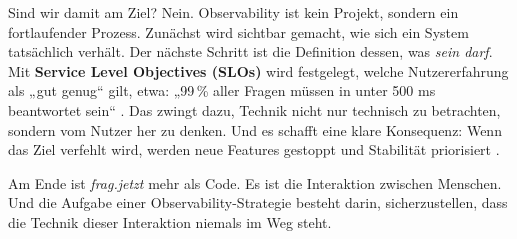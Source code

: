 Sind wir damit am Ziel? Nein. Observability ist kein Projekt, sondern ein fortlaufender Prozess. Zunächst wird sichtbar gemacht, wie sich ein System tatsächlich verhält. Der nächste Schritt ist die Definition dessen, was \emph{sein darf}. Mit \textbf{Service Level Objectives (SLOs)} wird festgelegt, welche Nutzererfahrung als „gut genug“ gilt, etwa: „99\,\% aller Fragen müssen in unter 500 ms beantwortet sein“ \cite{ewaschukMonitoringDistributedSystems}. Das zwingt dazu, Technik nicht nur technisch zu betrachten, sondern vom Nutzer her zu denken. Und es schafft eine klare Konsequenz: Wenn das Ziel verfehlt wird, werden neue Features gestoppt und Stabilität priorisiert \cite{abieba2025advanced}.

Am Ende ist \emph{frag.jetzt} mehr als Code. Es ist die Interaktion zwischen Menschen. Und die Aufgabe einer Observability-Strategie besteht darin, sicherzustellen, dass die Technik dieser Interaktion niemals im Weg steht.



